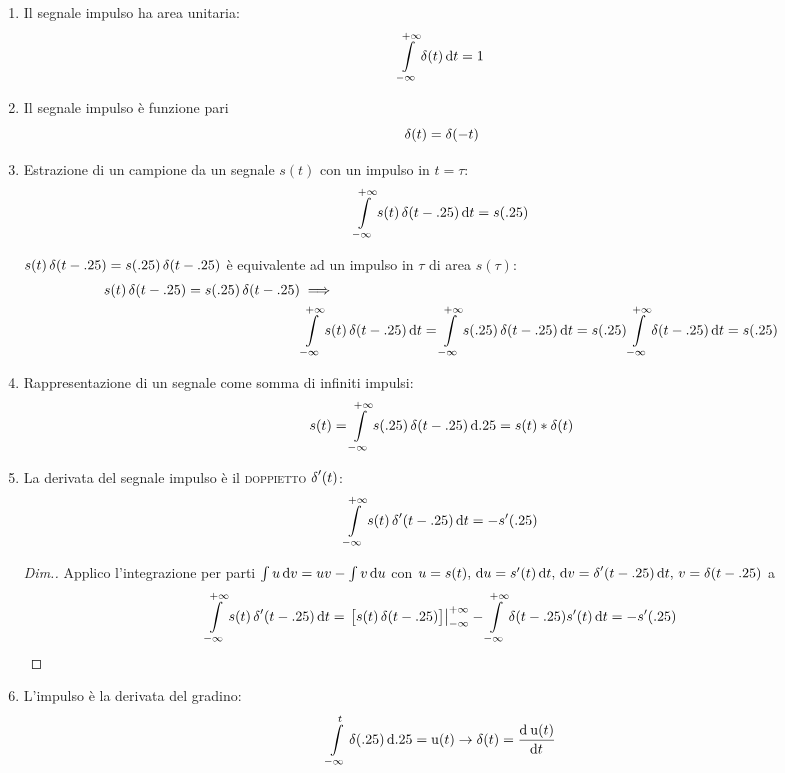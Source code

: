 \begin{enumerate}
	\item Il segnale impulso ha area unitaria:
	\begin{equation}
	\intinf{\impulse(t)}{t}=1
	\end{equation}
	\item Il segnale impulso è funzione pari
	\begin{equation}
	\impulse(t)=\impulse(-t)
	\end{equation}
	\item Estrazione di un campione da un segnale $s(t)$ con un impulso in $t=\tau$:
	\begin{equation}
	\intinf{s(t)\impulse(t-\tau)}{t}=s(\tau)
	\end{equation}

	$s(t)\impulse(t-\tau)=s(\tau)\impulse(t-\tau)$ è equivalente ad un impulso in $\tau$ di area $s(\tau)$:
	\begin{align*}
	s(t)\impulse(t-\tau)=s(\tau)\impulse(t-\tau) &\implies \\
	& \intinf{s(t)\impulse(t-\tau)}{t} =\intinf{s(\tau)\impulse(t-\tau)}{t} = s(\tau)\intinf{\impulse(t-\tau)}{t} = s(\tau)
	\end{align*}

	\item Rappresentazione di un segnale come somma di infiniti impulsi:
	\begin{equation}
	s(t)=\intinf{s(\tau)\impulse(t-\tau)}{\tau}=s(t)\ast\impulse(t)
	\end{equation}

	\item La derivata del segnale impulso è il \textsc{doppietto} $\impulse'(t)$:
	\begin{equation}
	\intinf{s(t)\impulse'(t-\tau)}{t}=-s'(\tau)
	\end{equation}

	\begin{proof}[Dim.]
		Applico l'integrazione per parti $\int{u\diff v}=u v-\int{v\diff u}$ con $u=s(t) ,\, \diff u=s'(t)\diff t ,\, \diff v=\impulse'(t-\tau)\diff t ,\, v=\impulse(t-\tau)$  a
		\[\intinf{s(t)\impulse'(t-\tau)}{t}= \restrict{\bigl[ s(t)\impulse(t-\tau)\bigr]}{-\infty}^{+\infty} -\intinf{\impulse(t-\tau)s'(t)}{t}=-s'(\tau)\]
	\end{proof}
	\item L'impulso è la derivata del gradino:
	\begin{equation}
	\intd{-\infty}{t}{\impulse(\tau)}{\tau}=\step(t) \to \impulse(t)=\deriv{\step(t)}{t}
	\end{equation}

\end{enumerate}

